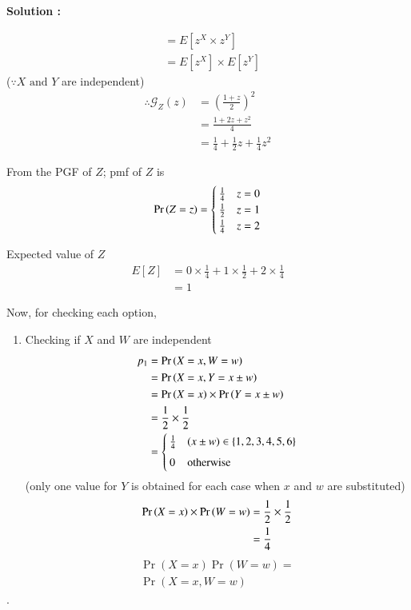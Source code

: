 \documentclass[journal,12pt,twocolumn]{IEEEtran}
\newenvironment{Proof}[2] {\textbf{Solution : }}{\hfill$\cdot$}
\begin{document}
\begin{Proof}{}{}
\begin{lemma}
\begin{align}
                   &= E[z^X \times z^Y]\\
                   &= E[z^X]\times E[z^Y] 
\end{align}
($\because X \text{ and } Y$ are independent)
\begin{align}
 \therefore \mathcal{G}_Z(z) &=\left(\frac{1 + z}{2}\right)^2\\
                   &= \frac{1+2z+z^2}{4}\\
                   &= \frac{1}{4} + \frac{1}{2}z + \frac{1}{4}z^2
\end{align}
\end{lemma}
\begin{lemma}
From the PGF of $Z$; \;pmf of $Z$ is
\begin{align}
    \Pr\left(Z = z\right) = 
\begin{cases}
\frac{1}{4} & z=0
\\
\frac{1}{2} & z=1\\
\frac{1}{4} & z=2
\end{cases}\label{2}
\end{align}
\end{lemma}
\begin{lemma}
Expected value of $Z$
\begin{align}
   E[Z] &= 0\times\frac{1}{4} + 1\times\frac{1}{2} + 2\times\frac{1}{4}\\
                     &= 1
\end{align}
\end{lemma}


Now, for checking each option,
\begin{enumerate}
    \item Checking if $X$ and $W$ are independent
\begin{align}
    p_1 &= \Pr\left(X=x,W=w\right)\\
        &= \Pr\left(X=x,Y=x\pm w\right)\\
        &=\Pr\left(X=x\right)\times\Pr\left(Y=x\pm w\right)\\
        &= \frac{1}{2}\times\frac{1}{2}\\
        &= \begin{cases}
        \frac{1}{4} & (x\pm w) \in \{1, 2, 3, 4, 5, 6\}\\ ~\\[-1em]
        0 & \text{otherwise}
    \end{cases}
\end{align}
(only one value for $Y$ is obtained for each case when $x$ and $w$ are substituted)
\begin{align}
    \Pr\left(X=x\right)\times\Pr\left(W=w\right) &= \frac{1}{2} \times\frac{1}{2} \\
                           &= \frac{1}{4}
\end{align}
\begin{multline}
    \Pr{(X=x)}\Pr{(W=w)} =\\ \Pr{(X=x,W=w)}
\end{multline}


\end{enumerate}
\end{Proof}
\end{document}
